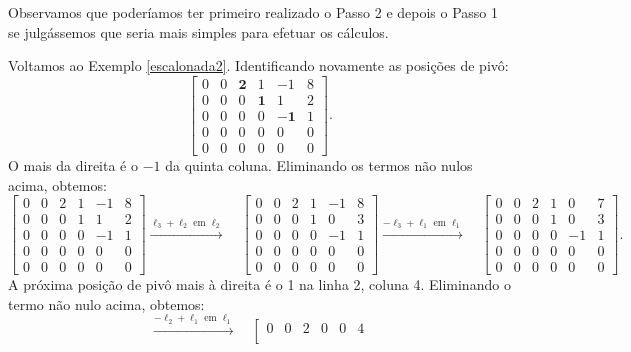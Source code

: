 \documentclass[../livro.tex]{subfiles} %
\begin{document}
Observamos que poderíamos ter primeiro realizado o Passo 2 e depois o Passo 1 se julgássemos que seria mais simples para efetuar os cálculos.

\begin{example}
    Voltamos ao Exemplo \ref{escalonada2}. Identificando novamente as posições de pivô:
\begin{equation}
\left[
\begin{array}{cccccc}
   0&0&\mathbf{2}&1&-1&8\\
   0&0&0&\mathbf{1}&1&2\\
   0&0&0&0&\mathbf{-1}&1\\
   0&0&0&0&0&0\\
   0&0&0&0&0&0
\end{array}
\right].
\end{equation} O mais da direita é o $-1$ da quinta coluna. Eliminando os termos não nulos acima, obtemos:
\begin{equation}
\left[
\begin{array}{cccccc}
   0&0&2&1&-1&8\\
   0&0&0&1&1&2\\
   0&0&0&0&-1&1\\
   0&0&0&0&0&0\\
   0&0&0&0&0&0
\end{array}
\right]
\xrightarrow{\ell_3 + \ell_2 \text{ em } \ell_2} \quad
\left[
\begin{array}{cccccc}
   0&0&2&1&-1&8\\
   0&0&0&1&0&3\\
   0&0&0&0&-1&1\\
   0&0&0&0&0&0\\
   0&0&0&0&0&0
\end{array}
\right]
\xrightarrow{-\ell_3 + \ell_1 \text{ em } \ell_1} \quad
\left[
\begin{array}{cccccc}
   0&0&2&1&0&7\\
   0&0&0&1&0&3\\
   0&0&0&0&-1&1\\
   0&0&0&0&0&0\\
   0&0&0&0&0&0
\end{array}
\right].
\end{equation} A próxima posição de pivô mais à direita é o 1 na linha 2, coluna 4. Eliminando o termo não nulo acima, obtemos:
\begin{equation}
\xrightarrow{-\ell_2 + \ell_1 \text{ em } \ell_1} \quad
\left[
\begin{array}{cccccc}
   0&0&2&0&0&4\\

\end{array}
\end{equation}
\end{example}
\end{document}
